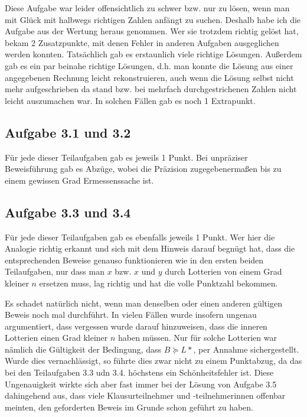 \documentclass[10pt, a4paper, german]{article}
\numberwithin {equation}{section}
\begin{document}
Diese Aufgabe war leider offensichtlich zu schwer bzw. nur zu lösen, wenn man mit
Glück mit halbwegs richtigen Zahlen anfängt zu suchen. Deshalb habe ich die
Aufgabe aus der Wertung heraus genommen. Wer sie trotzdem richtig gelöst hat,
bekam 2 Zusatzpunkte, mit denen Fehler in anderen Aufgaben ausgeglichen werden
konnten. Tatsächlich gab es erstaunlich viele richtige Lösungen. Außerdem gab es
ein par beinahe richtige Lösungen, d.h. man konnte die Lösung aus einer angegebenen
Rechnung leicht rekonstruieren, auch wenn die Lösung selbst nicht mehr
aufgeschrieben da stand bzw. bei mehrfach durchgestrichenen Zahlen nicht leicht
auszumachen war. In solchen Fällen gab es noch 1 Extrapunkt.

\subsection{Aufgabe 3.1 und 3.2}

Für jede dieser Teilaufgaben gab es jeweils 1 Punkt. Bei unpräziser
Beweisführung gab es Abzüge, wobei die Präzision zugegebenermaßen bis zu einem gewissen Grad
Ermessenssache ist. %

\subsection{Aufgabe 3.3 und 3.4}

Für jede dieser Teilaufgaben gab es ebenfalls jeweils 1 Punkt. Wer hier die
Analogie richtig erkannt und sich mit dem Hinweis darauf begnügt hat, dass die
entsprechenden Beweise genauso funktionieren wie in den ersten beiden
Teilaufgaben, nur dass man $x$ bzw. $x$ und $y$ durch Lotterien von einem Grad
kleiner $n$ ersetzen muss, lag richtig und hat die volle Punktzahl bekommen.

Es schadet natürlich nicht, wenn man denselben oder einen anderen gültigen
Beweis noch mal durchführt. In vielen Fällen wurde insofern ungenau
argumentiert, dass vergessen wurde darauf hinzuweisen, dass die inneren
Lotterien einen Grad kleiner $n$ haben müssen. Nur für solche Lotterien war
nämlich die Gültigkeit der Bedingung, dass $B \succeq L*$, per Annahme
sichergestellt. Wurde dies vernachlässigt, so führte dies zwar nicht zu einem
Punktabzug, da das bei den Teilaufgaben 3.3 udn 3.4. höchstens ein
Schönheitsfehler ist. Diese Ungenauigkeit wirkte sich aber fast immer bei der
Lösung von Aufgabe 3.5 dahingehend aus, dass viele Klausurteilnehmer und
-teilnehmerinnen offenbar meinten, den geforderten Beweis im Grunde schon
geführt zu haben.
\end{document}

